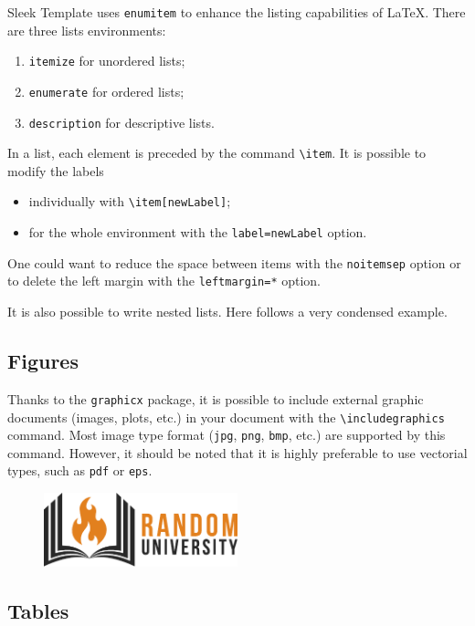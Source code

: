 \documentclass[a4paper, 12pt]{report}
\def\tbs{\textbackslash}
\begin{document}
Sleek Template uses \texttt{enumitem} to enhance the listing capabilities of \LaTeX{}. There are three lists environments:
\begin{enumerate}
	\item \texttt{itemize} for unordered lists;
	\item \texttt{enumerate} for ordered lists;
	\item \texttt{description} for descriptive lists.
\end{enumerate}

In a list, each element is preceded by the command \texttt{\tbs{}item}. It is possible to modify the labels
\begin{itemize}
	\item individually with \texttt{\tbs{}item[newLabel]};
	\item for the whole environment with the \texttt{label=newLabel} option.
\end{itemize}

One could want to reduce the space between items with the \texttt{noitemsep} option or to delete the left margin with the \texttt{leftmargin=*} option.

It is also possible to write nested lists. Here follows a very condensed example.

\subsection{Figures}

Thanks to the \texttt{graphicx} package, it is possible to include external graphic documents (images, plots, etc.) in your document with the \texttt{\tbs{}includegraphics} command. Most image type format (\texttt{jpg}, \texttt{png}, \texttt{bmp}, etc.) are supported by this command. However, it should be noted that it is highly preferable to use vectorial types, such as \texttt{pdf} or \texttt{eps}.

\begin{figure}[H]
	\centering
	\includegraphics[width=0.5\textwidth]{resources/pdf/logo.pdf}
	\label{fig:random_university_logo}
\end{figure}

\subsection{Tables}
\end{document}
